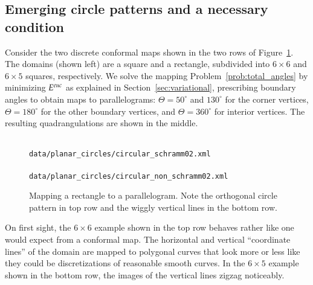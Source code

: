 \documentclass[Thesis]{subfiles}
\begin{document}
\subsection{Emerging circle patterns and a necessary condition}
\label{sec:schramm_and_condition}

Consider the two discrete conformal maps shown in the two rows of
Figure~\ref{fig:cyclic_parallelogram}. The domains (shown left) are a
square and a rectangle, subdivided into $6\times 6$ and $6\times 5$
squares, respectively.  We solve the mapping
Problem~\ref{prob:total_angles} by minimizing $E^{\euc}$ as explained
in Section~\ref{sec:variational}, prescribing boundary angles to
obtain maps to parallelograms: $\Theta=50^{\circ}$ and $130^{\circ}$
for the corner vertices, $\Theta=180^{\circ}$ for the other boundary
vertices, and $\Theta=360^{\circ}$ for interior vertices. The
resulting quadrangulations are shown in the middle. 
\begin{figure}
\centering
{}\hfill%
\hspace{-0.05\textwidth}%
\\
\scriptsize\tt data/planar\_circles/circular\_schramm02.xml\\
\hfill%
\hspace{-0.05\textwidth}%
\\
\scriptsize\tt data/planar\_circles/circular\_non\_schramm02.xml\\
\caption{
Mapping a rectangle to a parallelogram. Note the orthogonal circle
pattern in top row and the wiggly vertical lines
in the bottom row. 
}
\label{fig:cyclic_parallelogram}
\end{figure}


On first sight, the $6\times 6$ example shown in the top row behaves
rather like one would expect from a conformal map. The horizontal and
vertical ``coordinate lines'' of the domain are mapped to polygonal
curves that look more or less like they could be discretizations of
reasonable smooth curves. In the $6\times 5$ example shown in the
bottom row, the images of the vertical lines zigzag noticeably.
\end{document}
